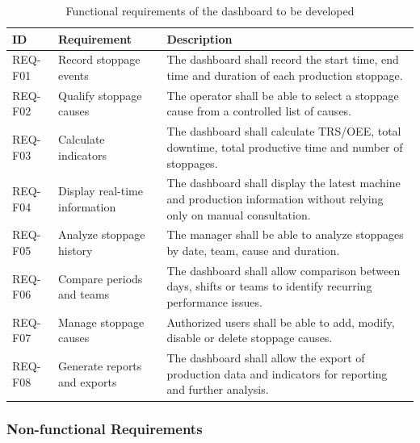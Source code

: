 \begin{table}[H]
\centering
\caption{Functional requirements of the dashboard to be developed}
\begin{tabular}{|l|l|p{5.5cm}|}
\hline
\textbf{ID} & \textbf{Requirement} & \textbf{Description} \\
\hline
REQ-F01 & Record stoppage events & The dashboard shall record the start time, end time and duration of each production stoppage. \\
\hline
REQ-F02 & Qualify stoppage causes & The operator shall be able to select a stoppage cause from a controlled list of causes. \\
\hline
REQ-F03 & Calculate indicators & The dashboard shall calculate TRS/OEE, total downtime, total productive time and number of stoppages. \\
\hline
REQ-F04 & Display real-time information & The dashboard shall display the latest machine and production information without relying only on manual consultation. \\
\hline
REQ-F05 & Analyze stoppage history & The manager shall be able to analyze stoppages by date, team, cause and duration. \\
\hline
REQ-F06 & Compare periods and teams & The dashboard shall allow comparison between days, shifts or teams to identify recurring performance issues. \\
\hline
REQ-F07 & Manage stoppage causes & Authorized users shall be able to add, modify, disable or delete stoppage causes. \\
\hline
REQ-F08 & Generate reports and exports & The dashboard shall allow the export of production data and indicators for reporting and further analysis. \\
\hline
\end{tabular}
\label{tab:chapter1-1}
\end{table}

\subsubsection{\fontsize{13}{16}\selectfont Non-functional Requirements}

